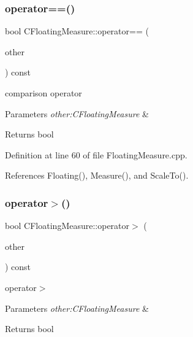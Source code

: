 \subsubsection{\texorpdfstring{operator==()}{operator==()}}
{\footnotesize\ttfamily bool C\+Floating\+Measure\+::operator== (\begin{DoxyParamCaption}\item[{const \hyperlink{classCFloatingMeasure}{C\+Floating\+Measure} \&}]{other }\end{DoxyParamCaption}) const}



comparison operator 


\begin{DoxyParams}{Parameters}
{\em other\+:\+C\+Floating\+Measure} & \\
\hline
\end{DoxyParams}
\begin{DoxyReturn}{Returns}
bool 
\end{DoxyReturn}


Definition at line 60 of file Floating\+Measure.\+cpp.



References Floating(), Measure(), and Scale\+To().

\mbox{\label{classCFloatingMeasure_a59cd04759c33941c7c20db3c81dcde14}} 
\subsubsection{\texorpdfstring{operator$>$()}{operator>()}}
{\footnotesize\ttfamily bool C\+Floating\+Measure\+::operator$>$ (\begin{DoxyParamCaption}\item[{const \hyperlink{classCFloatingMeasure}{C\+Floating\+Measure} \&}]{other }\end{DoxyParamCaption}) const}



operator$>$ 


\begin{DoxyParams}{Parameters}
{\em other\+:\+C\+Floating\+Measure} & \\
\hline
\end{DoxyParams}
\begin{DoxyReturn}{Returns}
bool 
\end{DoxyReturn}


